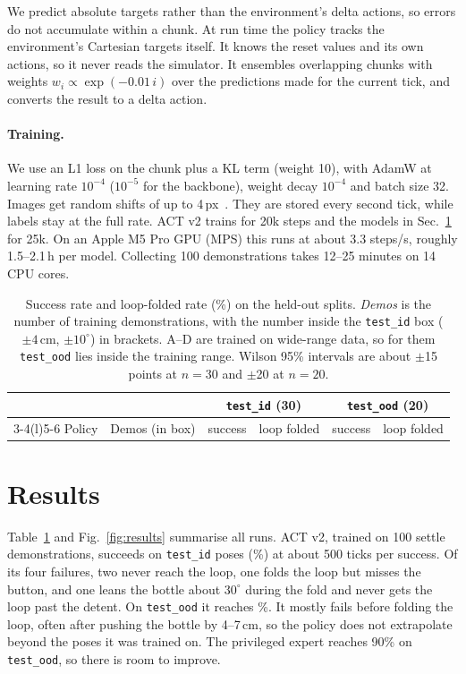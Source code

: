 \documentclass[10pt,twocolumn,letterpaper]{article}
\newcommand{\ttt}[1]{\texttt{\small #1}}
\begin{document}
We predict absolute targets rather than the environment's delta actions, so errors do not accumulate within a
chunk. At run time the policy tracks the environment's Cartesian targets itself. It knows the reset values and
its own actions, so it never reads the simulator. It ensembles overlapping chunks with weights
$w_i\propto\exp(-0.01\,i)$ over the predictions made for the current tick, and converts the result to a delta
action.

\paragraph{Training.} We use an L1 loss on the chunk plus a KL term (weight 10), with AdamW at learning rate
$10^{-4}$ ($10^{-5}$ for the backbone), weight decay $10^{-4}$ and batch size 32. Images get random shifts of
up to 4\,px~\cite{drq}. They are stored every second tick, while labels stay at the full rate. ACT v2 trains
for 20k steps and the models in Sec.~\ref{sec:results} for 25k. On an Apple M5 Pro GPU (MPS) this runs at about
3.3 steps/s, roughly 1.5--2.1\,h per model. Collecting 100 demonstrations takes 12--25 minutes on 14 CPU
cores.

\begin{table}[t]
\centering
\caption{Success rate and loop-folded rate (\%) on the held-out splits. \emph{Demos} is the number of
training demonstrations, with the number inside the \ttt{test\_id} box ($\pm4$\,cm, $\pm10^\circ$) in
brackets. A--D are trained on wide-range data, so for them \ttt{test\_ood} lies inside the training range.
Wilson 95\% intervals are about $\pm$15 points at $n=30$ and $\pm$20 at $n=20$.}
\label{tab:results}
\small
\begin{tabular}{@{}lrrrrr@{}}
\toprule
& & \multicolumn{2}{c}{\ttt{test\_id} (30)} & \multicolumn{2}{c}{\ttt{test\_ood} (20)} \\
\cmidrule(lr){3-4}\cmidrule(l){5-6}
Policy & Demos (in box) & success & loop folded & success & loop folded \\
\midrule

\end{tabular}
\end{table}

\section{Results}\label{sec:results}
Table~\ref{tab:results} and Fig.~\ref{fig:results} summarise all runs. ACT v2, trained on 100 settle
demonstrations, succeeds on \VtwoIdK{} \ttt{test\_id} poses (\VtwoId\%) at about 500 ticks per success. Of its
four failures, two never reach the loop, one folds the loop but misses the button, and one leans the bottle
about $30^\circ$ during the fold and never gets the loop past the detent. On \ttt{test\_ood} it reaches \VtwoOod\%. It mostly fails before folding the loop, often after
pushing the bottle by 4--7\,cm, so the policy does not extrapolate beyond the poses it was trained on. The
privileged expert reaches 90\% on \ttt{test\_ood}, so there is room to improve.
\end{document}
